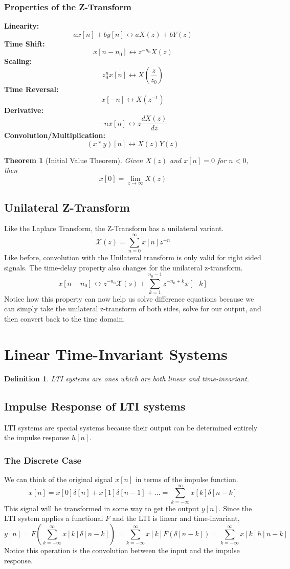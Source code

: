 \documentclass{article}
\newtheorem{theorem}{Theorem}
\newtheorem{definition}{Definition}
\begin{document}
\subsubsection{Properties of the Z-Transform}
\textbf{Linearity: } 
$$ax[n] + by[n] \leftrightarrow aX(z) + bY(z)$$
\textbf{Time Shift: }
$$x[n-n_0] \leftrightarrow z^{-n_0}X(z)$$
\textbf{Scaling: }
$$z_0^nx[n] \leftrightarrow X\left(\frac{z}{z_0}\right)$$
\textbf{Time Reversal: } 
$$x[-n] \leftrightarrow X(z^{-1})$$
\textbf{Derivative: } 
$$-nx[n] \leftrightarrow z\frac{dX(z)}{dz}$$
\textbf{Convolution/Multiplication: } 
$$(x*y)[n] \leftrightarrow X(z)Y(z)$$
\begin{theorem}[Initial Value Theorem]
    Given $X(z)$ and $x[n]=0$ for $n<0$, then $$x[0] = \lim_{z\rightarrow\infty}{X(z)}$$
\end{theorem}
\subsection{Unilateral Z-Transform}
Like the Laplace Transform, the Z-Transform has a unilateral variant.
$$\mathcal{X}(z) = \sum_{n=0}^{\infty}{x[n]z^{-n}}$$
Like before, convolution with the Unilateral transform is only valid for right sided signals.
The time-delay property also changes for the unilateral z-transform.
$$x[n-n_0] \leftrightarrow z^{-n_0}\mathcal{X}(s)+\sum_{k=1}^{n_0-1}{z^{-n_0+k}x[-k]}$$
Notice how this property can now help us solve difference equations because we can simply take the unilateral z-transform
of both sides, solve for our output, and then convert back to the time domain.
\section{Linear Time-Invariant Systems}
\begin{definition}
    LTI systems are ones which are both linear and time-invariant.
\end{definition}
\subsection{Impulse Response of LTI systems}
LTI systems are special systems because their output can be determined entirely the impulse response $h[n]$.
\subsubsection{The Discrete Case}
We can think of the original signal $x[n]$ in terms of the impulse function.
$$x[n] = x[0]\delta[n]+x[1]\delta[n-1]+... = \sum_{k=-\infty}^{\infty}{x[k]\delta[n-k]}$$
This signal will be transformed in some way to get the output $y[n]$.
Since the LTI system applies a functional $F$ and the LTI is linear and time-invariant,
$$y[n] = F(\sum_{k=-\infty}^{\infty}{x[k]\delta[n-k]}) = \sum_{k=-\infty}^{\infty}{x[k]F(\delta[n-k])} = \sum_{k=-\infty}^{\infty}{x[k]h[n-k]}$$
Notice this operation is the convolution between the input and the impulse response.
\end{document}
